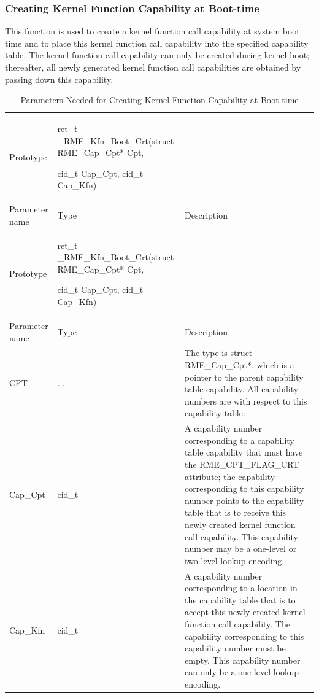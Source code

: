 \subsubsection{Creating Kernel Function Capability at Boot-time}\label{subsubsec:7-create-kernel-function-capability-at-boot}

This function is used to create a kernel function call capability at system boot time and to place this kernel function call capability into the specified capability table. The kernel function call capability can only be created during kernel boot; thereafter, all newly generated kernel function call capabilities are obtained by passing down this capability.

\begin{xltabular}{\textwidth}{@{}>{\hsize\raggedright\arraybackslash}X>{\hsize\raggedright\arraybackslash}X>{\hsize\raggedright\arraybackslash}X@{}}
\caption{Parameters Needed for Creating Kernel Function Capability at Boot-time}\label{tab:7-53-create-kernel-function-capability-at-boot-parameters}\\
\toprule
Prototype\strut
 & ret\_t \_RME\_Kfn\_Boot\_Crt(struct RME\_Cap\_Cpt* Cpt,

cid\_t Cap\_Cpt, cid\_t Cap\_Kfn)\strut
 & \strut
\tabularnewline
Parameter name & Type & Description\tabularnewline
\endfirsthead
\toprule
Prototype\strut
 & ret\_t \_RME\_Kfn\_Boot\_Crt(struct RME\_Cap\_Cpt* Cpt,

cid\_t Cap\_Cpt, cid\_t Cap\_Kfn)\strut
 & \strut
\tabularnewline
Parameter name & Type & Description\tabularnewline
\midrule
\endhead
\bottomrule
\endlastfoot
CPT & ... &
The type is struct RME\_Cap\_Cpt*, which is a pointer to the parent capability table capability. All capability numbers are with respect to this capability table.\tabularnewline
Cap\_Cpt & cid\_t &
A capability number corresponding to a capability table capability that must have the RME\_CPT\_FLAG\_CRT attribute; the capability corresponding to this capability number points to the capability table that is to receive this newly created kernel function call capability. This capability number may be a one-level or two-level lookup encoding.\tabularnewline
Cap\_Kfn & cid\_t &
A capability number corresponding to a location in the capability table that is to accept this newly created kernel function call capability. The capability corresponding to this capability number must be empty. This capability number can only be a one-level lookup encoding.\tabularnewline
\end{xltabular}
\nopagebreak[4]

